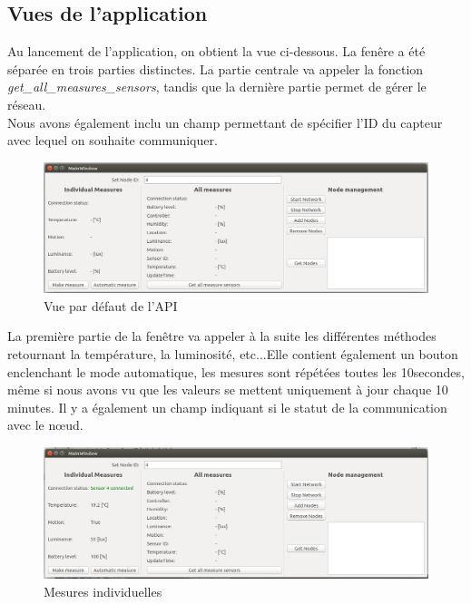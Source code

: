 \subsection{Vues de l'application}
Au lancement de l'application, on obtient la vue ci-dessous. La fenêre a été séparée en trois parties distinctes.  La partie centrale va appeler la fonction \textit{get\_all\_measures\_sensors}, tandis que la dernière partie permet de gérer le réseau.\\
Nous avons également inclu un champ permettant de spécifier l'ID du capteur avec lequel on souhaite communiquer.
\begin{figure}[H]
	\begin{center}
		\includegraphics[width=16cm]{img/api1.png}
		\caption{Vue par défaut de l'API}
		\label{api}
	\end{center}
\end{figure}
La première partie de la fenêtre va appeler à la suite les différentes méthodes retournant la température, la luminosité, etc...Elle contient également un bouton enclenchant le mode automatique, les mesures sont répétées toutes les 10secondes, même si nous avons vu que les valeurs se mettent uniquement à jour chaque 10 minutes. Il y a également un champ indiquant si le statut de la communication avec le nœud.
\begin{figure}[H]
	\begin{center}
		\includegraphics[width=16cm]{img/api2.png}
		\caption{Mesures individuelles}
		\label{api2}
	\end{center}
\end{figure} 

